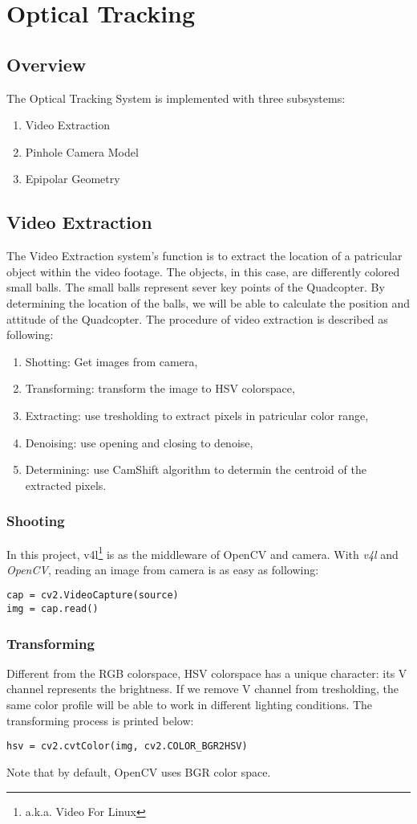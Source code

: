 \section{Optical Tracking}
\subsection{Overview}
The Optical Tracking System is implemented with three subsystems: 
\begin{enumerate}
  \item Video Extraction
  \item Pinhole Camera Model
  \item Epipolar Geometry
\end{enumerate}
\subsection{Video Extraction}
The Video Extraction system's function is to extract the location of a patricular object within the video footage. The objects, in this case, are differently colored small balls. The small balls represent sever key points of the Quadcopter. By determining the location of the balls, we will be able to calculate the position and attitude of the Quadcopter.
The procedure of video extraction is described as following:
\begin{enumerate}
  \item Shotting: Get images from camera,
  \item Transforming: transform the image to HSV colorspace,
  \item Extracting: use tresholding to extract pixels in patricular color range,
  \item Denoising: use opening and closing to denoise,
  \item Determining: use CamShift algorithm to determin the centroid of the extracted pixels.
\end{enumerate}
\subsubsection {Shooting}
In this project, v4l\footnote{a.k.a. Video For Linux} is as the middleware of OpenCV and camera. With \emph{v4l} and \emph{OpenCV}, reading an image from camera is as easy as following:
\lstset{language=python}
\begin{lstlisting}
cap = cv2.VideoCapture(source)
img = cap.read()
\end{lstlisting}
\subsubsection {Transforming}
Different from the RGB colorspace, HSV colorspace has a unique character: its V channel represents the brightness. If we remove V channel from tresholding, the same color profile will be able to work in different lighting conditions.
The transforming process is printed below:
\begin{lstlisting}
hsv = cv2.cvtColor(img, cv2.COLOR_BGR2HSV)
\end{lstlisting}
Note that by default, OpenCV uses BGR color space.
